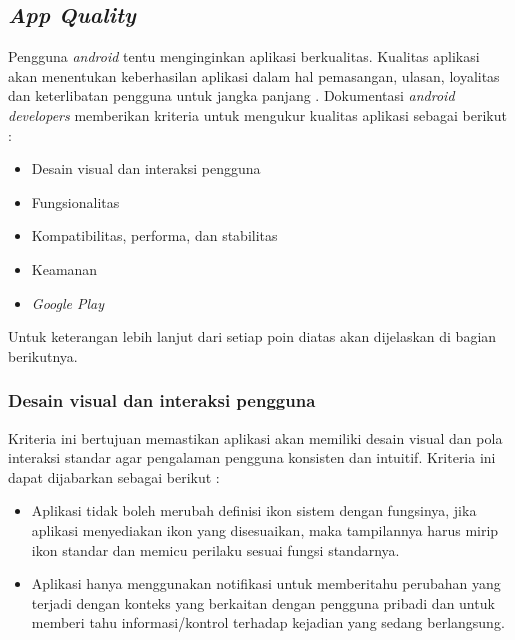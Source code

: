 \subsection{\textit{App Quality}}
Pengguna \textit{android} tentu menginginkan aplikasi berkualitas. Kualitas aplikasi akan menentukan keberhasilan aplikasi dalam hal pemasangan, ulasan, loyalitas dan keterlibatan pengguna untuk jangka panjang \cite{androiddesign}. Dokumentasi \textit{android developers} memberikan kriteria untuk mengukur kualitas aplikasi sebagai berikut :
\begin{itemize}
    \item Desain visual dan interaksi pengguna
    \item Fungsionalitas
    \item Kompatibilitas, performa, dan stabilitas
    \item Keamanan   
    \item \textit{Google Play}
\end{itemize}
Untuk keterangan lebih lanjut dari setiap poin diatas akan dijelaskan di bagian berikutnya.

\subsubsection{Desain visual dan interaksi pengguna}
Kriteria ini bertujuan memastikan aplikasi akan memiliki desain visual dan pola interaksi standar agar pengalaman pengguna konsisten dan intuitif\cite{androiddev}. Kriteria ini dapat dijabarkan sebagai berikut : 
\begin{itemize}
    \item Aplikasi tidak boleh merubah definisi ikon sistem dengan fungsinya, jika aplikasi menyediakan ikon yang disesuaikan, maka tampilannya harus mirip ikon standar dan memicu perilaku sesuai fungsi standarnya. 
    \item Aplikasi hanya menggunakan notifikasi untuk memberitahu perubahan yang terjadi dengan konteks yang berkaitan dengan pengguna pribadi dan untuk memberi tahu informasi/kontrol terhadap kejadian yang sedang berlangsung.
\end{itemize}

